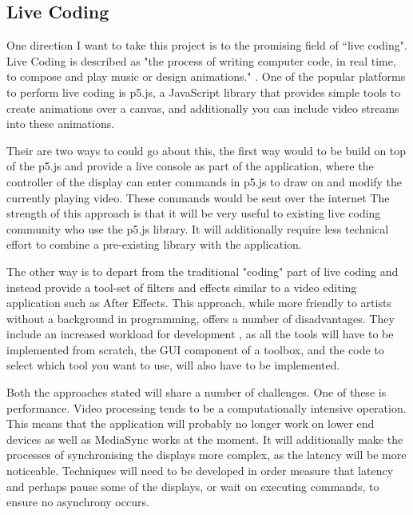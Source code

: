 \documentclass{article}
\begin{document}
\subsection{Live Coding}
One direction I want to take this project is to the promising field of ``live coding". Live Coding is described as "the process of writing computer code, in real time, to compose and play music or design animations."  \cite{palmer_2009}. One of the popular platforms to perform live coding is p5.js, a JavaScript library that provides simple tools to create animations over a canvas, and additionally you can include video streams into these animations. 

Their are two ways to could go about this, the first way would to be build on top of the p5.js and provide a live console as part of the application, where the controller of the display can enter commands in p5.js to draw on and modify the currently playing video. These commands would be sent over the internet The strength of this approach is that it will be very useful to existing live coding community who use the p5.js library. It will additionally require less technical effort to combine a pre-existing library with the application. 

The other way is to depart from the traditional "coding" part of live coding and instead provide a tool-set of filters and effects similar to a video editing application such as After Effects. This approach, while more friendly to artists without a background in programming, offers a number of disadvantages. They include an increased workload for development , as all the tools will have to be implemented from scratch, the GUI component of a toolbox, and the code to select which tool you want to use, will also have to be implemented.

Both the approaches stated will share a number of challenges. One of these is performance. Video processing tends to be a computationally intensive operation. This means that the application will probably no longer work on lower end devices as well as MediaSync works at the moment. It will additionally make the processes of synchronising the displays more complex, as the latency will be more noticeable. Techniques will need to be developed in order measure that latency and perhaps pause some of the displays, or wait on executing commands, to ensure no asynchrony occurs. 
 
\end{document}
